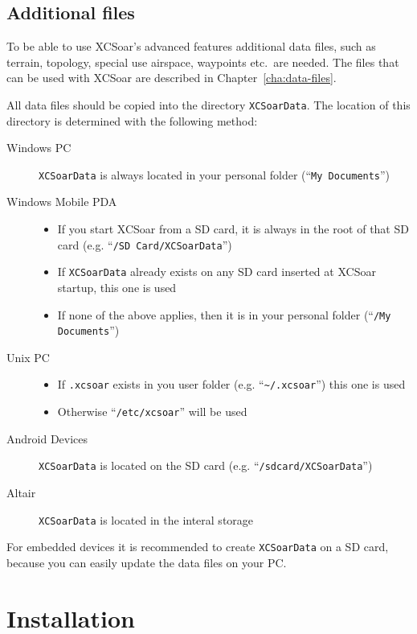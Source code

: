 \documentclass[a4paper,12pt]{refrep}
\begin{document}
\subsection*{Additional files}
To be able to use XCSoar's advanced features additional data files, such as
terrain, topology, special use airspace, waypoints etc.\ are needed. The files
that can be used with XCSoar are described in Chapter~\ref{cha:data-files}.

All data files should be copied into the directory \texttt{XCSoarData}. The
location of this directory is determined with the following method:

\begin{description}
\item[Windows PC]
\texttt{XCSoarData} is always located in your personal folder (``\texttt{My
Documents}'')
\item[Windows Mobile PDA]
\begin{itemize}
\item If you start XCSoar from a SD card, it is always in the root of
  that SD card (e.g. ``\texttt{/SD Card/XCSoarData}'')
\item If \texttt{XCSoarData} already exists on any SD card inserted
  at XCSoar startup, this one is used
\item If none of the above applies, then it is in your personal folder
  (``\texttt{/My Documents}'')
\end{itemize}
\item[Unix PC]
\begin{itemize}
\item If \texttt{.xcsoar} exists in you user folder (e.g.
``\texttt{\~{}/.xcsoar}'') this one is used
\item Otherwise ``\texttt{/etc/xcsoar}'' will be used
\end{itemize}
\item[Android Devices]
\texttt{XCSoarData} is located on the SD card (e.g.
``\texttt{/sdcard/XCSoarData}'')
\item[Altair]
\texttt{XCSoarData} is located in the interal storage
\end{description}

For embedded devices it is recommended to create \texttt{XCSoarData} on a SD
card, because you can easily update the data files on your PC.

\section{Installation}
\end{document}

